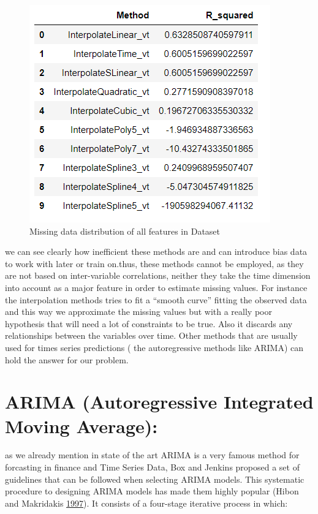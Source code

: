 \begin{figure}
\centering
\includegraphics[width=.4\textwidth]{img/results_R.png} 
\caption{Missing data distribution of all features in Dataset}
\label{fig:score}
\end{figure}
we can see clearly how inefficient these methods are and can introduce bias data to work with later or train on.thus, these methods cannot be employed, as they are not  based on inter-variable correlations, neither they take the time dimension into account as a major feature in order to estimate missing values. For instance the interpolation methods tries to fit a “smooth curve” fitting the observed data and this way we approximate the missing values but with a really poor hypothesis that will need a lot of constraints to be true. Also it discards any relationships between the variables over time. Other methods that are usually used for times series predictions ( the autoregressive methods like ARIMA) can hold the answer for our problem.


\section{ ARIMA (Autoregressive Integrated Moving Average):}
as we already mention in state of the art ARIMA is a very famous method for forcasting in finance and Time Series Data,  
Box and Jenkins proposed a set of guidelines that can be followed when
selecting ARIMA models. This systematic procedure to designing ARIMA
models has made them highly popular (Hibon and Makridakis
\protect\hyperlink{ref-spyros1997}{1997}).  It consists of a four-stage iterative process in which:

